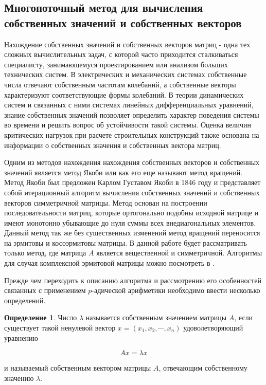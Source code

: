 \documentclass[master, och, diploma, times]{sty/SCWorks}
\theoremstyle{plain}
\theoremstyle{definition}
\newtheorem{defn}{Определение}[section]
\numberwithin{equation}{section}
\begin{document}
\subsection{Многопоточный метод для вычисления собственных значений и собственных векторов}

Нахождение собственных значений и собственных векторов матриц - одна тех сложных вычислительных задач, с которой часто приходится сталкиваться специалисту, занимающемуся проектированием или анализом больших технических систем.  В электрических и механических системах собственные числа отвечают собственным частотам колебаний, а собственные векторы характеризуют соответствующие формы колебаний. В теории динамических систем и связанных с ними системах линейных дифференциальных уравнений, знание собственных значений позволяет определить характер поведения системы во времени и решить вопрос об устойчивости такой системы. Оценка величин критических нагрузок при расчете строительных конструкций также основана на информации о собственных значения и собственных вектора матриц. 

Одним из методов нахождения нахождения собственных векторов и собственных значений является метод Якоби или как его еще называют метод вращений. Метод Якоби был предложен Карлом Густавом Якоби в 1846 году и представляет собой итерационный алгоритм вычисления собственных значений и собственных векторов симметричной матрицы. Метод основан на построении последовательности матриц, которые ортогонально подобны исходной матрице и имеют монотонно убывающие до нуля суммы всех внедиагональных элементов. Данный метод так же без существенных изменений метод вращений переносится на эрмитовы и косоэрмитовы матрицы. В данной работе будет рассматривать только метод, где матрица $A$ является вещественной и симметричной. Алгоритмы для случая комплексной эрмитовой матрицы можно посмотреть в \cite{bib:numbers:voevodin}.

Прежде чем переходить к описанию алгоритма и рассмотрению его особенностей связанных с применением $p$-адической арифметики необходимо ввести несколько определений.


\begin{defn}
Число $\lambda$ называется собственным значением матрицы $A$, если существует такой ненулевой вектор $x=(x_1,x_2,\cdots,x_n)$ удоволетворяющий уравнению

\begin{equation}
Ax=\lambda x
\end{equation}
	
\noindent и называемый собственным вектором матрицы $A$, отвечающим собственному значению $\lambda$.
\end{defn}
\end{document}
